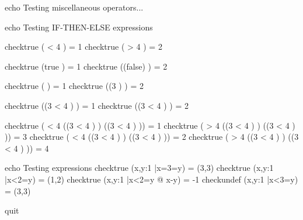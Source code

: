%

echo Testing miscellaneous operators...


echo     Testing IF-THEN-ELSE expressions


checktrue ( < 4  ) = 1
checktrue ( > 4  ) = 2

checktrue (\IF true  ) = 1
checktrue (\IF (false)  ) = 2

checktrue ( \in \nat {} ) = 1
checktrue (\IF (3 \notin \nat)  ) = 2

checktrue (\IF (3 < 4  \in \nat)  ) = 1
checktrue (\IF \lnot (3 < 4  \in \nat)  ) = 2

checktrue ( < 4 \THEN (\IF (3 < 4  \in \nat)  ) \ELSE (\IF (3 < 4  \in \nat) )) = 1
checktrue ( > 4 \THEN (\IF (3 < 4  \in \nat)  ) \ELSE (\IF (3 < 4  \in \nat) )) = 3
checktrue ( < 4 \THEN (\IF (3 < 4  \notin \nat)  ) \ELSE (\IF (3 < 4  \in \nat) )) = 2
checktrue ( > 4 \THEN (\IF (3 < 4  \in \nat)  ) \ELSE (\IF (3 < 4  \notin \nat) )) = 4


echo     Testing \mu expressions
checktrue  (\mu x,y:1 |x=3=y) = (3,3)
checktrue  (\mu x,y:1 |x<2=y) = (1,2)
checktrue  (\mu x,y:1 |x<2=y @ x-y) = -1
checkundef (\mu x,y:1 |x<3=y) = (3,3)

quit
